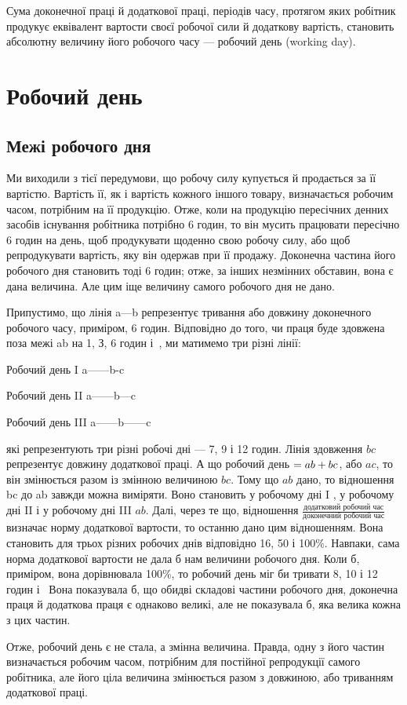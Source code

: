 Сума доконечної праці й додаткової праці, періодів часу,
протягом яких робітник продукує еквівалент вартости своєї робочої
сили й додаткову вартість, становить абсолютну величину
його робочого часу — робочий день (working day).

\section{Робочий день}
\subsection{Межі робочого дня}

Ми виходили з тієї передумови, що робочу силу купується
й продається за її вартістю. Вартість її, як і вартість кожного
іншого товару, визначається робочим часом, потрібним на
її продукцію. Отже, коли на продукцію пересічних денних засобів
існування робітника потрібно 6 годин, то він мусить працювати
пересічно 6 годин на день, щоб продукувати щоденно свою робочу
силу, або щоб репродукувати вартість, яку він одержав при її
продажу. Доконечна частина його робочого дня становить тоді
6 годин; отже, за інших незмінних обставин, вона є дана величина.
Але цим іще величину самого робочого дня не дано.

Припустимо, що лінія a---b репрезентує тривання
або довжину доконечного робочого часу, приміром, 6 годин. Відповідно
до того, чи праця буде здовжена поза межі ab на 1, З,
6 годин і~, ми матимемо три різні лінії:

Робочий день I
a------b-c

Робочий день II
a------b---c

Робочий день III
a------b------c

\noindent{} які репрезентують три різні робочі дні — 7, 9 і 12 годин. Лінія
здовження $bc$ репрезентує довжину додаткової праці. А що робочий
день $= ab \dplus{} bc$, або $ac$, то він змінюється разом із змінною
величиною $bc$. Тому що $ab$ дано, то відношення bc до ab завжди
можна виміряти. Воно становить у робочому дні I , у робочому
дні II  і у робочому дні III  $ab$. Далі, через те що, відношення
$\frac{\text{додатковий робочий час}}{\text{доконечний робочий час}}$ визначає норму додаткової вартости, то
останню дано цим відношенням. Вона становить для трьох різних
робочих днів відповідно 16, 50 і 100\%. Навпаки, сама норма
додаткової вартости не дала б нам величини робочого дня. Коли
б, приміром, вона дорівнювала 100\%, то робочий день міг би
тривати 8, 10 і 12 годин і~ Вона показувала б, що обидві
складові частини робочого дня, доконечна праця й додаткова
праця є однаково великі, але не показувала б, яка велика кожна
з цих частин.

Отже, робочий день є не стала, а змінна величина. Правда,
одну з його частин визначається робочим часом, потрібним для
постійної репродукції самого робітника, але його ціла величина
змінюється разом з довжиною, або триванням додаткової праці.
\parbreak{}  %
